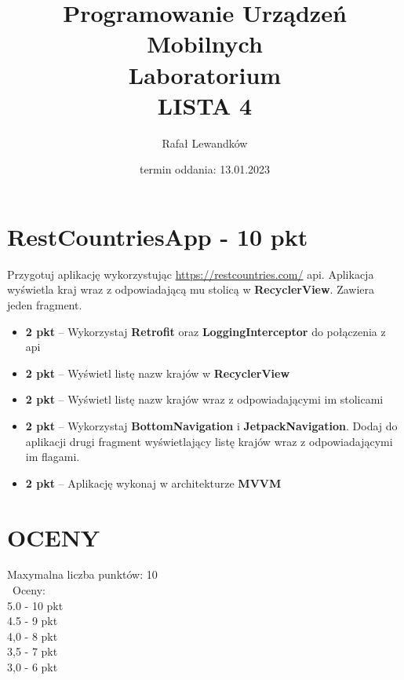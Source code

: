 \documentclass[a4paper]{article}
\title{Programowanie Urządzeń Mobilnych \\ Laboratorium \\ \textbf{LISTA 4}}
\author{Rafał Lewandków}
\date{termin oddania: 13.01.2023}
\begin{document}
\maketitle
    

\section*{RestCountriesApp - 10 pkt}

Przygotuj aplikację wykorzystując \url{https://restcountries.com/} api. Aplikacja wyświetla kraj wraz z odpowiadającą mu stolicą w \textbf{RecyclerView}. Zawiera jeden fragment.

\begin{itemize}
\item \textbf{2 pkt} -- Wykorzystaj \textbf{Retrofit} oraz \textbf{LoggingInterceptor} do połączenia z api

\item \textbf{2 pkt} -- Wyświetl listę nazw krajów w \textbf{RecyclerView}

\item \textbf{2 pkt} -- Wyświetl listę nazw krajów wraz z odpowiadającymi im stolicami

\item \textbf{2 pkt} -- Wykorzystaj \textbf{BottomNavigation} i \textbf{JetpackNavigation}. Dodaj do aplikacji drugi fragment wyświetlający listę krajów wraz z odpowiadającymi im flagami.

\item \textbf{2 pkt} -- Aplikację wykonaj w architekturze \textbf{MVVM}
\end{itemize}

\section*{OCENY}
Maxymalna liczba punktów: 10\\\
Oceny:\\
5.0 - 10 pkt\\
4.5 - 9 pkt\\
4,0 - 8 pkt\\
3,5 - 7 pkt\\
3,0 - 6 pkt
\end{document}
